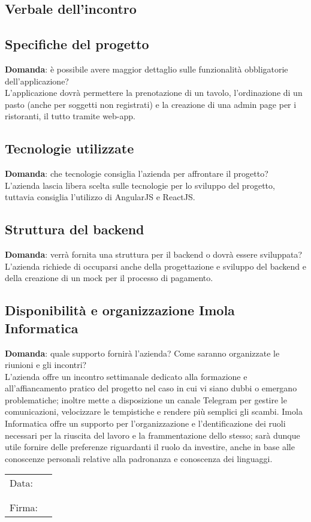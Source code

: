 \documentclass[italian,12pt]{article} %
\begin{document}
\begin{flushleft}
\section{Verbale dell'incontro}

\subsection{Specifiche del progetto}
	\textbf{Domanda}: è possibile avere maggior dettaglio sulle funzionalità obbligatorie dell'applicazione?\\
	L'applicazione dovrà permettere la prenotazione di un tavolo, l'ordinazione di un pasto (anche per soggetti non registrati) e la creazione di una admin page per i ristoranti, il tutto tramite web-app.\\
\subsection{Tecnologie utilizzate}
	\textbf{Domanda}: che tecnologie consiglia l'azienda per affrontare il progetto?\\
	L'azienda lascia libera scelta sulle tecnologie per lo sviluppo del progetto, tuttavia consiglia l'utilizzo di AngularJS e ReactJS. \\
\subsection{Struttura del backend}
	\textbf{Domanda}: verrà fornita una struttura per il backend o dovrà essere sviluppata?\\
	L'azienda richiede di occuparsi anche della progettazione e sviluppo del backend e della creazione di un mock per il processo di pagamento.\\

\subsection{Disponibilità e organizzazione Imola Informatica}
	\textbf{Domanda}: quale supporto fornirà l'azienda? Come saranno organizzate le riunioni e gli incontri?\\
	L’azienda offre un incontro settimanale dedicato alla formazione e all’affiancamento pratico del progetto nel caso in cui vi 
	siano dubbi o emergano problematiche; inoltre mette a disposizione un canale Telegram per gestire le comunicazioni, velocizzare le tempistiche e rendere più semplici gli scambi. Imola Informatica offre un supporto per 
	l’organizzazione e l’dentificazione dei ruoli necessari per la riuscita del lavoro e la frammentazione dello stesso; 
	sarà dunque utile fornire delle preferenze riguardanti il ruolo da investire, anche in base alle conoscenze personali 
	relative alla padronanza e conoscenza dei linguaggi.
	
\end{flushleft}


\vspace*{4cm}
\begin{table}[b]
\begin{tabular}{@{}p{.5in}p{4in}@{}}
	Data:  & \hrulefill \\
		   &     		\\
		   &     		\\
	Firma: & \hrulefill \\
\end{tabular}
\end{table}
	
\end{document}
